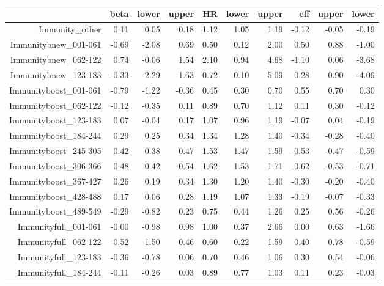 \begin{table}[ht]
\centering
\begin{tabular}{rrrrrrrrrr}
  \hline
 & beta & lower & upper & HR & lower & upper & eff & upper & lower \\ 
  \hline
Immunity\_other & 0.11 & 0.05 & 0.18 & 1.12 & 1.05 & 1.19 & -0.12 & -0.05 & -0.19 \\ 
  Immunitybnew\_001-061 & -0.69 & -2.08 & 0.69 & 0.50 & 0.12 & 2.00 & 0.50 & 0.88 & -1.00 \\ 
  Immunitybnew\_062-122 & 0.74 & -0.06 & 1.54 & 2.10 & 0.94 & 4.68 & -1.10 & 0.06 & -3.68 \\ 
  Immunitybnew\_123-183 & -0.33 & -2.29 & 1.63 & 0.72 & 0.10 & 5.09 & 0.28 & 0.90 & -4.09 \\ 
  Immunityboost\_001-061 & -0.79 & -1.22 & -0.36 & 0.45 & 0.30 & 0.70 & 0.55 & 0.70 & 0.30 \\ 
  Immunityboost\_062-122 & -0.12 & -0.35 & 0.11 & 0.89 & 0.70 & 1.12 & 0.11 & 0.30 & -0.12 \\ 
  Immunityboost\_123-183 & 0.07 & -0.04 & 0.17 & 1.07 & 0.96 & 1.19 & -0.07 & 0.04 & -0.19 \\ 
  Immunityboost\_184-244 & 0.29 & 0.25 & 0.34 & 1.34 & 1.28 & 1.40 & -0.34 & -0.28 & -0.40 \\ 
  Immunityboost\_245-305 & 0.42 & 0.38 & 0.47 & 1.53 & 1.47 & 1.59 & -0.53 & -0.47 & -0.59 \\ 
  Immunityboost\_306-366 & 0.48 & 0.42 & 0.54 & 1.62 & 1.53 & 1.71 & -0.62 & -0.53 & -0.71 \\ 
  Immunityboost\_367-427 & 0.26 & 0.19 & 0.34 & 1.30 & 1.20 & 1.40 & -0.30 & -0.20 & -0.40 \\ 
  Immunityboost\_428-488 & 0.17 & 0.06 & 0.28 & 1.19 & 1.07 & 1.33 & -0.19 & -0.07 & -0.33 \\ 
  Immunityboost\_489-549 & -0.29 & -0.82 & 0.23 & 0.75 & 0.44 & 1.26 & 0.25 & 0.56 & -0.26 \\ 
  Immunityfull\_001-061 & -0.00 & -0.98 & 0.98 & 1.00 & 0.37 & 2.66 & 0.00 & 0.63 & -1.66 \\ 
  Immunityfull\_062-122 & -0.52 & -1.50 & 0.46 & 0.60 & 0.22 & 1.59 & 0.40 & 0.78 & -0.59 \\ 
  Immunityfull\_123-183 & -0.36 & -0.78 & 0.06 & 0.70 & 0.46 & 1.06 & 0.30 & 0.54 & -0.06 \\ 
  Immunityfull\_184-244 & -0.11 & -0.26 & 0.03 & 0.89 & 0.77 & 1.03 & 0.11 & 0.23 & -0.03 \\ 

\end{tabular}
\end{table}
